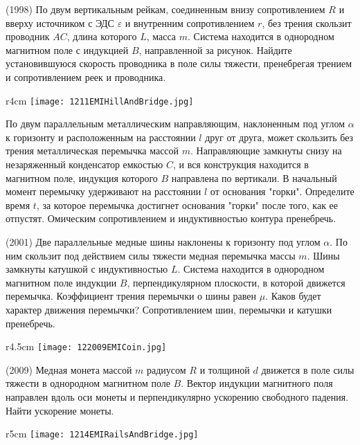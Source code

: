 \AddProb (1998) По двум вертикальным рейкам, соединенным внизу сопротивлением $R$ и вверху источником с ЭДС {\Large $\varepsilon$} 
и внутренним сопротивлением $r$, без трения скользит проводник $AC$, длина которого $L$, масса $m$. 
Система находится в однородном магнитном поле с индукцией $B$, направленной за рисунок. 
Найдите установившуюся скорость проводника в поле силы тяжести, пренебрегая трением и сопротивлением реек и проводника.

\begin{wrapfigure}{r}{4cm}
\texttt{[image: 1211EMIHillAndBridge.jpg]}
\end{wrapfigure}

\AddProb По двум параллельным металлическим направляющим, наклоненным под углом $\alpha$ к горизонту и 
расположенным на расстоянии $l$ друг от друга, может скользить без трения металлическая перемычка массой $m$. 
Направляющие замкнуты снизу на незаряженный конденсатор емкостью $C$, и вся конструкция находится в магнитном поле, 
индукция которого $B$ направлена по вертикали. В начальный момент перемычку удерживают на расстоянии $l$ от основания "горки". 
Определите время $t$, за которое перемычка достигнет основания "горки" после того, как ее отпустят. 
Омическим сопротивлением и индуктивностью контура пренебречь.

\AddProb (2001) Две параллельные медные шины наклонены к горизонту под углом  $\alpha$. 
По ним скользит под действием силы тяжести медная перемычка массы $m$. Шины замкнуты катушкой с индуктивностью $L$. 
Система находится в однородном магнитном поле индукции $B$, перпендикулярном плоскости, в которой движется перемычка. 
Коэффициент трения перемычки о шины равен $\mu$. Каков будет характер движения перемычки? Сопротивлением шин, перемычки и катушки пренебречь.

\begin{wrapfigure}{r}{4.5cm}
\texttt{[image: 122009EMICoin.jpg]}
\end{wrapfigure}

\AddProb (2009) Медная монета массой $m$ радиусом $R$ и толщиной $d$ движется в поле силы тяжести в однородном магнитном поле $B$. 
Вектор индукции магнитного поля направлен вдоль оси монеты и перпендикулярно ускорению свободного падения. Найти ускорение монеты.

\begin{wrapfigure}{r}{5cm}
\texttt{[image: 1214EMIRailsAndBridge.jpg]}
\end{wrapfigure}


